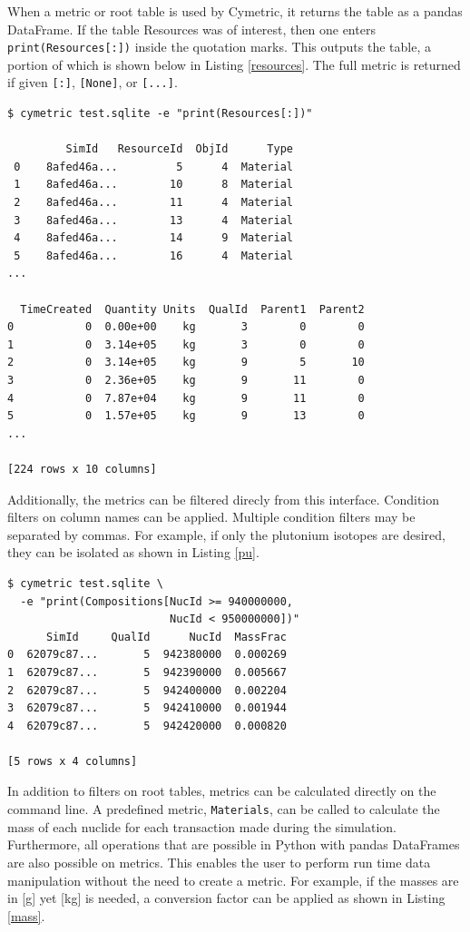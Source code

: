 \documentclass{anstrans}
\newcommand{\code}[1]{{\color{code}\texttt{#1}}}
\begin{document}
When a metric or root table is used by Cymetric, it returns the table 
as a pandas DataFrame. \cite{pandas0.15.2} If the table Resources was of interest, 
then one enters \code{print(Resources[:])} inside the quotation marks. 
This outputs the table, a portion of which is shown below in Listing 
\ref{resources}. The full metric is returned if given \code{[:]}, 
\code{[None]}, or \code{[...]}. 

\begin{lstlisting}[caption={Printing a Root Table}, label=resources]
$ cymetric test.sqlite -e "print(Resources[:])"

         SimId   ResourceId  ObjId      Type  
 0    8afed46a...         5      4  Material   
 1    8afed46a...        10      8  Material   
 2    8afed46a...        11      4  Material   
 3    8afed46a...        13      4  Material   
 4    8afed46a...        14      9  Material   
 5    8afed46a...        16      4  Material   
...

  TimeCreated  Quantity Units  QualId  Parent1  Parent2  
0           0  0.00e+00    kg       3        0        0  
1           0  3.14e+05    kg       3        0        0  
2           0  3.14e+05    kg       9        5       10  
3           0  2.36e+05    kg       9       11        0  
4           0  7.87e+04    kg       9       11        0  
5           0  1.57e+05    kg       9       13        0  
...

[224 rows x 10 columns]
\end{lstlisting}

Additionally, the metrics can be filtered direcly from this interface.
Condition filters on column names can be applied. Multiple condition
filters may be separated by commas. For example, if only the plutonium 
isotopes are desired, they can be isolated as shown in Listing \ref{pu}. 

\begin{lstlisting}[caption ={Filtering a Root Table}, label=pu]
$ cymetric test.sqlite \
  -e "print(Compositions[NucId >= 940000000, 
                         NucId < 950000000])"
      SimId     QualId      NucId  MassFrac
0  62079c87...       5  942380000  0.000269
1  62079c87...       5  942390000  0.005667
2  62079c87...       5  942400000  0.002204
3  62079c87...       5  942410000  0.001944
4  62079c87...       5  942420000  0.000820

[5 rows x 4 columns]
\end{lstlisting}

In addition to filters on root tables, metrics can  be calculated directly 
on the command line. A predefined metric, \code{Materials}, can be called 
to calculate the mass of each nuclide for each transaction made during 
the simulation. Furthermore, all operations that are possible in Python 
with pandas DataFrames are also possible on metrics.  This enables the user
to perform run time data manipulation without the need to create a metric.
For example, if the masses are in [g] yet [kg] is needed, 
a conversion factor can be applied as shown in Listing \ref{mass}.
\end{document}
